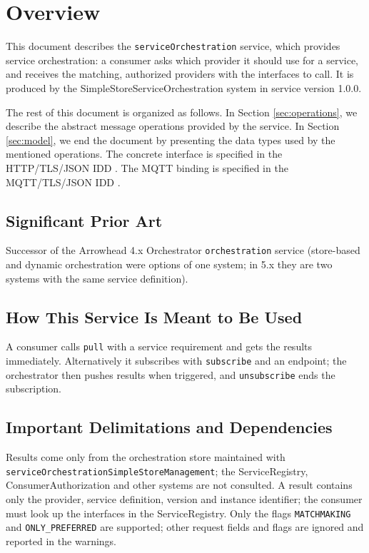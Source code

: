 \documentclass[a4paper]{arrowhead}
\begin{document}
\section{Overview}
\label{sec:overview}

This document describes the \texttt{service\allowbreak{}Orchestration} service, which provides service orchestration: a consumer asks which provider it should use for a service, and receives the matching, authorized providers with the interfaces to call.
It is produced by the SimpleStoreServiceOrchestration system \cite{ssso-sysd} in service version 1.0.0.

The rest of this document is organized as follows.
In Section \ref{sec:operations}, we describe the abstract message operations provided by the service.
In Section \ref{sec:model}, we end the document by presenting the data types used by the mentioned operations.
The concrete interface is specified in the HTTP/TLS/JSON IDD \cite{ssso-serviceOrchestration-http-idd}. The MQTT binding is specified in the MQTT/TLS/JSON IDD \cite{ssso-serviceOrchestration-mqtt-idd}.

\subsection{Significant Prior Art}

Successor of the Arrowhead 4.x Orchestrator \texttt{orchestration} service (store-based and dynamic orchestration were options of one system; in 5.x they are two systems with the same service definition).

\subsection{How This Service Is Meant to Be Used}

A consumer calls \texttt{pull} with a service requirement and gets the results immediately. Alternatively it subscribes with \texttt{subscribe} and an endpoint; the orchestrator then pushes results when triggered, and \texttt{unsubscribe} ends the subscription.

\subsection{Important Delimitations and Dependencies}
\label{sec:delimitations}

Results come only from the orchestration store maintained with \texttt{service\allowbreak{}Orchestration\allowbreak{}Simple\allowbreak{}Store\allowbreak{}Management}; the ServiceRegistry, Consumer\allowbreak{}Authorization and other systems are not consulted. A result contains only the provider, service definition, version and instance identifier; the consumer must look up the interfaces in the ServiceRegistry. Only the flags \texttt{MATCHMAKING} and \texttt{ONLY\_\allowbreak{}PREFERRED} are supported; other request fields and flags are ignored and reported in the warnings.
\end{document}
